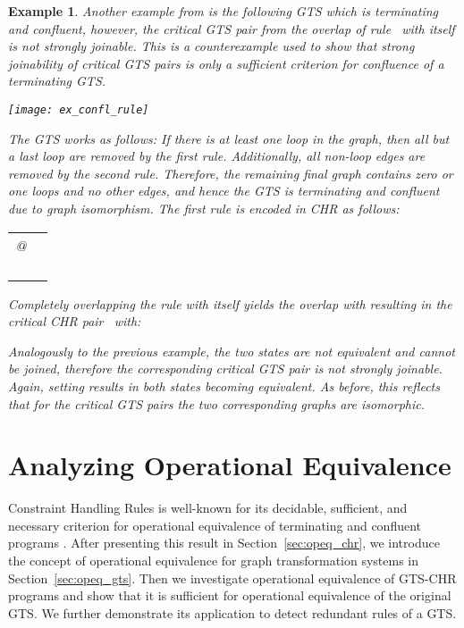 \documentclass{tlp}
\newtheorem{example}{Example}[section]
\begin{document}
\begin{example}\label{ex:counterexample}
Another example from \cite{plump05} is the following GTS which is terminating and
confluent, however, the critical GTS pair from the overlap of rule~ with
itself is not strongly joinable. This is a counterexample used to show that
strong joinability of critical GTS pairs is only a sufficient criterion for
confluence of a terminating GTS.

\begin{center} 
\texttt{[image: ex\_confl\_rule]}
\end{center}

The GTS works as follows: If there is at least one loop in the graph, then all
but a last loop are removed by the first rule. Additionally, all non-loop edges
are removed by the second rule. Therefore, the remaining final graph contains
zero or one loops and no other edges, and hence the GTS is terminating and
confluent due to graph isomorphism. The first rule is encoded in CHR as follows:

\begin{center} 
\begin{tabular}{ll}
 @ & \\
&  \\
&  \\
& \\
& 
\end{tabular}
\end{center}

Completely overlapping the rule with itself yields the overlap  with  resulting in the critical CHR pair~ with:


Analogously to the previous example, the two states are not equivalent and cannot
be joined, therefore the corresponding critical GTS pair is not strongly
joinable. Again, setting  results in both states becoming
equivalent. As before, this reflects that for the critical GTS pairs the two
corresponding graphs are isomorphic.
\end{example}

\section{Analyzing Operational Equivalence}
\label{sec:opeq}

Constraint Handling Rules is well-known for its decidable, sufficient, and
necessary criterion for operational equivalence of terminating and confluent
programs \cite{abdennadherfruehwirth99,fruehwirth09}. After presenting this
result in Section~\ref{sec:opeq_chr}, we introduce the concept of operational
equivalence for graph transformation systems in Section~\ref{sec:opeq_gts}. Then
we investigate operational equivalence of GTS-CHR programs and show that it is
sufficient for operational equivalence of the original GTS. We further
demonstrate its application to detect redundant rules of a GTS.
\end{document}
